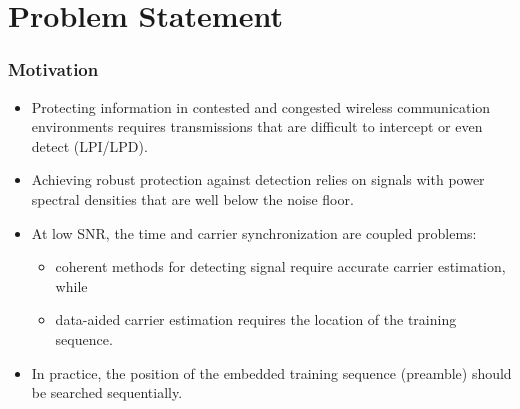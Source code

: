 \section{Problem Statement}


\begin{frame}
  \frametitle{Motivation}
  \begin{itemize}
    \item Protecting information in contested and congested wireless communication environments requires transmissions that are difficult to intercept or even detect (LPI/LPD). 
     \item Achieving robust protection against detection relies on signals with power spectral densities that are well below the noise floor. 
     \item At low SNR, the time and carrier synchronization are coupled problems:
     \begin{itemize}
      \item coherent methods for detecting signal require accurate carrier estimation, while
      \item data-aided carrier estimation requires the location of the training sequence.
     \end{itemize}
     \item In practice, the position of the embedded training sequence (preamble) should be searched sequentially.
 \end{itemize}
\end{frame}






